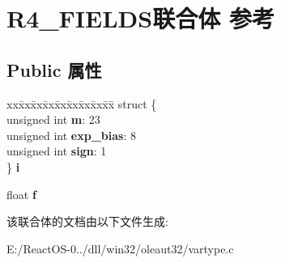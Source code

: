 \hypertarget{union_r4___f_i_e_l_d_s}{}\section{R4\+\_\+\+F\+I\+E\+L\+D\+S联合体 参考}
\label{union_r4___f_i_e_l_d_s}
\subsection*{Public 属性}
\begin{DoxyCompactItemize}
\item 
\mbox{\label{union_r4___f_i_e_l_d_s_a19f5eb2651219bb570062cc135790834}} 
\begin{tabbing}
xx\=xx\=xx\=xx\=xx\=xx\=xx\=xx\=xx\=\kill
struct \{\\
\>unsigned int {\bfseries m}: 23\\
\>unsigned int {\bfseries exp\_bias}: 8\\
\>unsigned int {\bfseries sign}: 1\\
\} {\bfseries i}\\

\end{tabbing}\item 
\mbox{\label{union_r4___f_i_e_l_d_s_aa4f5b5beb8510f0123c5863d16e1edf0}} 
float {\bfseries f}
\end{DoxyCompactItemize}


该联合体的文档由以下文件生成\+:\begin{DoxyCompactItemize}
\item 
E\+:/\+React\+O\+S-\/0../dll/win32/oleaut32/vartype.\+c\end{DoxyCompactItemize}

